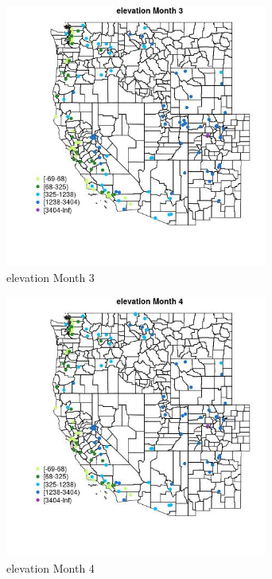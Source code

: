 \begin{figure} 
\centering  
\includegraphics[width=0.77\textwidth]{Code_Outputs/Report_ML_input_PM25_Step4_part_e_de_duplicated_aveswNAs_MapObsMo3elevation.jpg} 
\caption{\label{fig:Report_ML_input_PM25_Step4_part_e_de_duplicated_aveswNAsMapObsMo3elevation}elevation Month 3} 
\end{figure} 
 

\clearpage 

\begin{figure} 
\centering  
\includegraphics[width=0.77\textwidth]{Code_Outputs/Report_ML_input_PM25_Step4_part_e_de_duplicated_aveswNAs_MapObsMo4elevation.jpg} 
\caption{\label{fig:Report_ML_input_PM25_Step4_part_e_de_duplicated_aveswNAsMapObsMo4elevation}elevation Month 4} 
\end{figure} 
 

